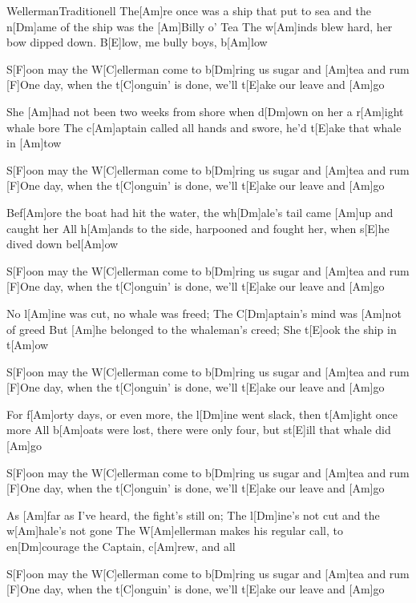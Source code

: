 \documentclass[../main.tex]{subfiles}
\begin{document}
\begin{song}[3]{Wellerman}{Traditionell}{}
The[Am]re once was a ship that put to sea and the n[Dm]ame of the ship was the [Am]Billy o' Tea
The w[Am]inds blew hard, her bow dipped down. B[E]low, me bully boys, b[Am]low

S[F]oon may the W[C]ellerman come to b[Dm]ring us sugar and [Am]tea and rum
[F]One day, when the t[C]onguin’ is done, we’ll t[E]ake our leave and [Am]go

She [Am]had not been two weeks from shore when d[Dm]own on her a r[Am]ight whale bore
The c[Am]aptain called all hands and swore, he'd t[E]ake that whale in [Am]tow

S[F]oon may the W[C]ellerman come to b[Dm]ring us sugar and [Am]tea and rum
[F]One day, when the t[C]onguin’ is done, we’ll t[E]ake our leave and [Am]go

Bef[Am]ore the boat had hit the water, the wh[Dm]ale's tail came [Am]up and caught her
All h[Am]ands to the side, harpooned and fought her, when s[E]he dived down bel[Am]ow

S[F]oon may the W[C]ellerman come to b[Dm]ring us sugar and [Am]tea and rum
[F]One day, when the t[C]onguin’ is done, we’ll t[E]ake our leave and [Am]go

No l[Am]ine was cut, no whale was freed; The C[Dm]aptain's mind was [Am]not of greed
But [Am]he belonged to the whaleman's creed; She t[E]ook the ship in t[Am]ow

S[F]oon may the W[C]ellerman come to b[Dm]ring us sugar and [Am]tea and rum
[F]One day, when the t[C]onguin’ is done, we’ll t[E]ake our leave and [Am]go

For f[Am]orty days, or even more, the l[Dm]ine went slack, then t[Am]ight once more
All b[Am]oats were lost, there were only four, but st[E]ill that whale did [Am]go

S[F]oon may the W[C]ellerman come to b[Dm]ring us sugar and [Am]tea and rum
[F]One day, when the t[C]onguin’ is done, we’ll t[E]ake our leave and [Am]go

As [Am]far as I've heard, the fight's still on; The l[Dm]ine's not cut and the w[Am]hale's not gone
The W[Am]ellerman makes his regular call, to en[Dm]courage the Captain, c[Am]rew, and all

S[F]oon may the W[C]ellerman come to b[Dm]ring us sugar and [Am]tea and rum
[F]One day, when the t[C]onguin’ is done, we’ll t[E]ake our leave and [Am]go
\end{song}
\end{document}
